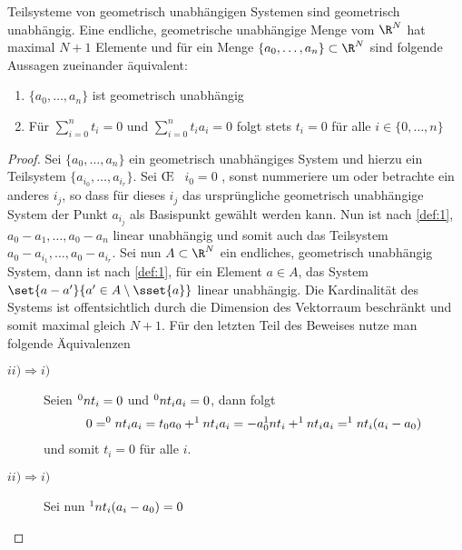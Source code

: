 \begin{Lem}\label{lem:1}
  Teilsysteme von geometrisch unabhängigen Systemen sind geometrisch
  unabhängig. Eine endliche, geometrische unabhängige Menge vom $\R^N$
  hat maximal $N+1$ Elemente und für ein Menge
  $\{ a_0 , \ldots , a_n \} \subset \R^N$ sind folgende Aussagen
  zueinander äquivalent:
  \begin{enumerate}[$(i)$]
  \item $\{ a_0 , \ldots , a_n \}$ ist geometrisch unabhängig
  \item Für $\sum\limits_{i=0}^n t_i = 0$ und
    $\sum\limits_{i=0}^n t_i a_i = 0$ folgt stets $t_i = 0$ für alle
    $i \in \{ 0,\ldots,n\}$
  \end{enumerate}
  \begin{proof}
    Sei $\{ a_0 , \ldots , a_n \}$ ein geometrisch unabhängiges System
    und hierzu ein Teilsystem $\{ a_{i_0},\ldots,a_{i_r} \}$.  Sei
    \OE~ $i_0 = 0$ , sonst nummeriere um oder betrachte ein anderes
    $i_j$, so dass für dieses $i_j$ das ursprüngliche geometrisch
    unabhängige System der Punkt $a_{i_j}$ als Basispunkt gewählt
    werden kann. Nun ist nach \cref{def:1},
    $ a_0 - a_1 , \ldots , a_0 - a_n$ linear unabhängig und somit auch
    das Teilsystem $ a_0 - a_ {i_1}, \ldots , a_0 - a_{i_r}$.  Sei nun
    $A \subset \R^N$ ein endliches, geometrisch unabhängig System,
    dann ist nach \cref{def:1}, für ein Element $a \in A$, das System
    $\set{ a - a'}{a' \in A \setminus \sset{a} }$ linear unabhängig.
    Die Kardinalität des Systems ist offentsichtlich durch die
    Dimension des Vektorraum beschränkt und somit maximal gleich
    $N+1$. Für den letzten Teil des Beweises nutze man folgende
    Äquivalenzen
    \begin{description}
    \item[$ii)
      \Rightarrow i)$] Seien $\sp{0}{n} t_i = 0$ und $\sp{0}{n} t_i
      a_i = 0$, dann folgt 
      \begin{gather*}
        0 = \sp{0}{n} t_i a_i = t_0 a_0 + \sp{1}{n} t_i a_i = -a_0
        \sp{1}{n} t_i + \sp{1}{n} t_i a_i = \sp{1}{n} t_i (a_i - a_0)
    \end{gather*}
    und somit $t_i = 0$ für alle $i$.
      \item[$ii) \Rightarrow i)$]
        Sei nun $\sp{1}{n} t_i (a_i - a_0) = 0$ 
    \end{description}
  \end{proof}
\end{Lem}

